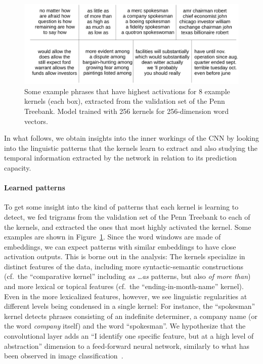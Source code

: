 
\begin{figure}[!t]
\centering
\includegraphics[width=\textwidth]{figures/kernels.pdf}
\centering
\caption{Some example phrases that have highest activations for 8 example kernels (each box), extracted from the validation set of the Penn Treebank. Model trained with 256 kernels for 256-dimension word vectors.}  
\label{fig:kernels}
\end{figure}

In what follows, we obtain insights into the inner workings of the CNN by looking into
the linguistic patterns that the kernels learn to extract and also studying
the temporal information extracted by the network in relation to its prediction capacity.

\paragraph{Learned patterns} 
To get some insight into the kind of patterns that each kernel is
learning to detect, we fed trigrams from the validation set of the
Penn Treebank to each of the kernels, and extracted the ones that most
highly activated the kernel. Some examples are shown in
Figure~\ref{fig:kernels}. Since the word windows are made of
embeddings, we can expect patterns with similar embeddings to have
close activation outputs.
This is borne out in the analysis: The kernels specialize in distinct
features of the data, including more syntactic-semantic constructions
(cf.\ the ``comparative kernel'' including \emph{as \dots as}
patterns, but also \emph{of more than}) and more lexical or topical
features (cf.\ the ``ending-in-month-name'' kernel). Even in the more
lexicalized features, however, we see linguistic regularities at
different levels being condensed in a single kernel: For instance, the
``spokesman'' kernel detects phrases consisting of an indefinite
determiner, a company name (or the word \emph{company} itself) and the
word ``spokesman''. We hypothesize that the convolutional layer adds
an ``I identify one specific feature, but at a high level of
abstraction'' dimension to a feed-forward neural network, similarly to
what has been observed in image
classification~\cite{krizhevsky2012imagenet}.

